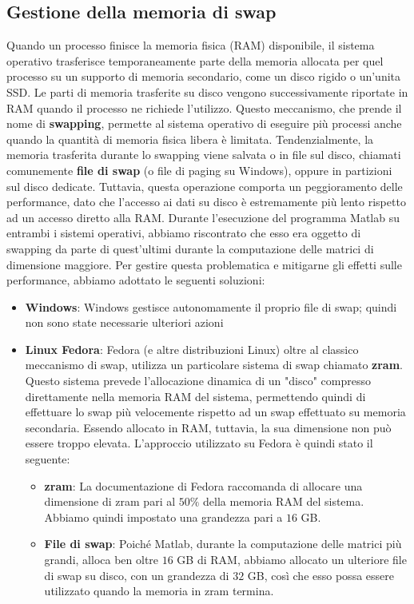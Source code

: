 \subsection{Gestione della memoria di swap}
Quando un processo finisce la memoria fisica (RAM) disponibile, il sistema operativo trasferisce temporaneamente parte della memoria allocata per quel processo su un
supporto di memoria secondario, come un disco rigido o un'unita SSD.
Le parti di memoria trasferite su disco vengono successivamente riportate in RAM quando il processo ne richiede l'utilizzo.
Questo meccanismo, che prende il nome di \textbf{swapping}, permette al sistema operativo di eseguire più processi anche quando la quantità di memoria fisica libera è limitata.
Tendenzialmente, la memoria trasferita durante lo swapping viene salvata o in file sul disco, chiamati comunemente \textbf{file di swap} (o file di paging su Windows), oppure in partizioni
sul disco dedicate. 
Tuttavia, questa operazione comporta un peggioramento delle performance, dato che l'accesso ai dati su disco è estremamente più lento rispetto ad un accesso diretto alla RAM.
Durante l'esecuzione del programma Matlab su entrambi i sistemi operativi, abbiamo riscontrato che esso era oggetto di swapping da parte di quest'ultimi durante la computazione delle matrici di dimensione
maggiore. Per gestire questa problematica e mitigarne gli effetti sulle performance, abbiamo adottato le seguenti soluzioni:
\begin{itemize}
	\item \textbf{Windows}: Windows gestisce autonomamente il proprio file di swap; quindi non sono state necessarie ulteriori azioni
	\item \textbf{Linux Fedora}: Fedora (e altre distribuzioni Linux) oltre al classico meccanismo di swap, utilizza un particolare sistema di swap chiamato \textbf{zram}. 
	Questo sistema prevede l'allocazione dinamica di un "disco" compresso direttamente nella memoria RAM del sistema, permettendo quindi di effettuare lo swap più velocemente rispetto ad un swap effettuato su memoria secondaria.
	Essendo allocato in RAM, tuttavia, la sua dimensione non può essere troppo elevata. L'approccio utilizzato su Fedora è quindi stato il seguente:
	\begin{itemize}
		\item \textbf{zram}: La documentazione di Fedora \cite{fedora_swap_on_zram} raccomanda di allocare una dimensione di zram pari al $50\%$ della memoria RAM del sistema. Abbiamo quindi impostato
		una grandezza pari a $16$ GB.
		\item \textbf{File di swap}: Poiché Matlab, durante la computazione delle matrici più grandi, alloca ben oltre $16$ GB di RAM, abbiamo allocato un ulteriore file di swap su disco, con un grandezza di $32$ GB,
		così che esso possa essere utilizzato quando la memoria in zram termina.
	\end{itemize}
\end{itemize}
